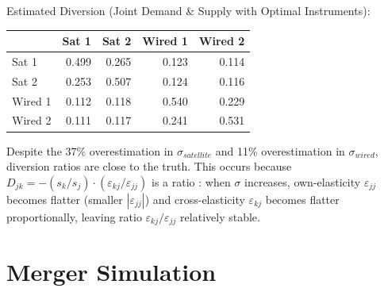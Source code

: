\documentclass[english,11pt]{article}
\begin{document}
\begin{enumerate}
Estimated Diversion (Joint Demand \& Supply with Optimal Instruments):
\begin{center}
\begin{tabular}{lrrrr}
\hline
 & Sat 1 & Sat 2 & Wired 1 & Wired 2 \\
\hline
Sat 1 & 0.499 & 0.265 & 0.123 & 0.114 \\
Sat 2 & 0.253 & 0.507 & 0.124 & 0.116 \\
Wired 1 & 0.112 & 0.118 & 0.540 & 0.229 \\
Wired 2 & 0.111 & 0.117 & 0.241 & 0.531 \\
\hline
\end{tabular}
\end{center}

Despite the 37\% overestimation in $\sigma_{satellite}$ and 11\% overestimation in $\sigma_{wired}$, diversion ratios are close to the truth. This occurs because $D_{jk} = -(s_k/s_j) \cdot (\varepsilon_{kj}/\varepsilon_{jj})$ is a ratio \citep{conlon2021diversion}: when $\sigma$ increases, own-elasticity $\varepsilon_{jj}$ becomes flatter (smaller $|\varepsilon_{jj}|$) and cross-elasticity $\varepsilon_{kj}$ becomes flatter proportionally, leaving ratio $\varepsilon_{kj}/\varepsilon_{jj}$ relatively stable. 


\end{enumerate}


\section{Merger Simulation}
\end{document}

